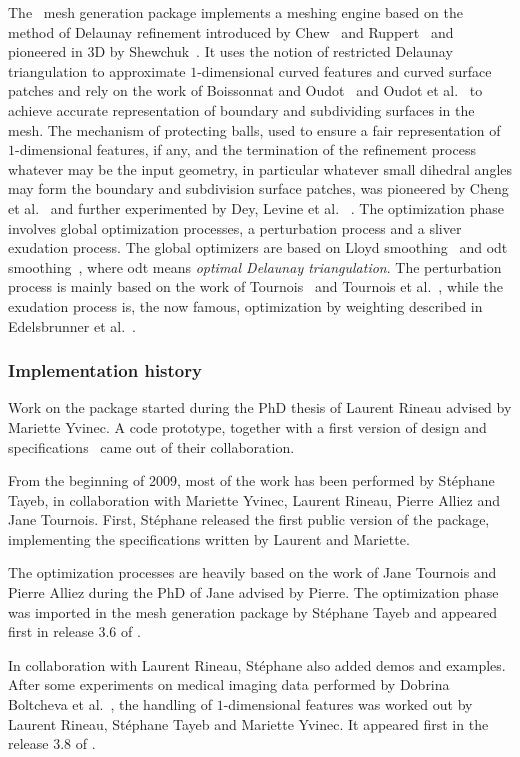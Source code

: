 The \cgal\ mesh generation package implements a  meshing engine based 
on the method of   Delaunay refinement introduced by Chew~\cite{c-gqmgc-93}  and Ruppert~\cite{r-draq2d-95}
and pioneered in 3D by Shewchuk~\cite{s-tmgdr-98}. 
It uses the notion of restricted Delaunay triangulation
 to approximate $1$-dimensional curved features and  curved surface patches
and rely on the work of Boissonnat and Oudot~\cite{cgal:bo-pgsms-05}
and Oudot et al.~\cite{cgal:ory-mvbss-05}
to achieve accurate representation of boundary and subdividing surfaces in the mesh.
The mechanism of protecting balls, used to ensure a fair representation
of $1$-dimensional features, if any, and the termination of the refinement process
whatever may be the input geometry, in particular whatever small dihedral angles may form
the boundary and subdivision surface patches,
was pioneered by Cheng et al.~\cite{cgal:cdr-drpsc-07} and further experimented by Dey, Levine et al.
~\cite{cgal:cdl-pdma-07}.
The optimization phase involves global optimization processes, a perturbation process
and a sliver exudation process. The global optimizers are based on Lloyd smoothing~\cite{cgal:dfg-cvtaa-99t, cgal:dw-tmgob-02}
and odt smoothing~\cite{cgal::c-mssbo-04,cgal:acyd-vtm-05}, where odt means
\emph{optimal Delaunay triangulation}. The perturbation process 
is mainly based on the work of Tournois~\cite{cgal:t-om-09}
and Tournois et al.~\cite{cgal:twad-iropitmg-09},
while the exudation process is, the now famous,  optimization by weighting described
in Edelsbrunner et al.~\cite{cgal:cdeft-slive-00}.


\subsubsection{Implementation history}
Work on the package  started during the PhD thesis of Laurent Rineau
advised by Mariette Yvinec.  A  code prototype, together
with a first version of design and specifications~\cite{cgal:ry-gsddrm-06}
came out of their collaboration.

From the beginning of 2009, most of the work has been performed by St\'ephane
Tayeb, in collaboration with Mariette Yvinec, Laurent Rineau, Pierre Alliez and Jane Tournois.
First, St\'ephane released the first public version of the package, implementing the specifications
written by Laurent and Mariette. 

The optimization processes are
heavily based on the work of Jane Tournois and Pierre Alliez
during the PhD of Jane advised by Pierre. The optimization phase was imported
in the mesh generation package by St\'ephane Tayeb
and appeared first in  release 3.6 of \cgal.

In collaboration with Laurent Rineau, St\'ephane also added demos and examples.
After some experiments on medical imaging data performed by
Dobrina Boltcheva et al.~\cite{cgal:byb-mgmmi-09, cgal:-byb-fpdmgmmi-09}, the handling
of $1$-dimensional features was worked out by Laurent Rineau, St\'ephane Tayeb
and Mariette Yvinec. It appeared first in the release 3.8  of \cgal.
 


